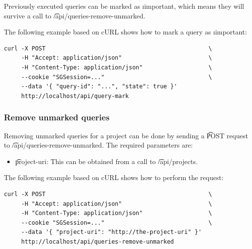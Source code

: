 \begin{sloppypar}
  Previously executed queries can be marked as \i{important}, which means
  they will survive a call to \t{/api/queries-remove-unmarked}.
\end{sloppypar}

  The following example based on cURL shows how to mark a query as
  \i{important}:
\begin{siderules}
\begin{verbatim}
curl -X POST                                               \
     -H "Accept: application/json"                         \
     -H "Content-Type: application/json"                   \
     --cookie "SGSession=..."                              \
     --data '{ "query-id": "...", "state": true }'
     http://localhost/api/query-mark
\end{verbatim}
\end{siderules}

\subsubsection{Remove unmarked queries}

  Removing unmarked queries for a project can be done by sending a
  \t{POST} request to \t{/api/queries-remove-unmarked}.
  The required parameters are:

  \begin{itemize}
    \item{\t{project-uri}: This can be obtained from a call to
      \t{/api/projects}.}
  \end{itemize}

  The following example based on cURL shows how to perform the request:
\begin{siderules}
\begin{verbatim}
curl -X POST                                               \
     -H "Accept: application/json"                         \
     -H "Content-Type: application/json"                   \
     --cookie "SGSession=..."                              \
     --data '{ "project-uri": "http://the-project-uri" }'
     http://localhost/api/queries-remove-unmarked
\end{verbatim}
\end{siderules}
